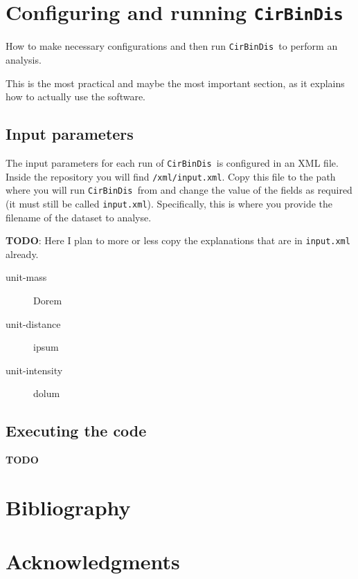 \documentclass[a4paper, 12pt, english, titlepage]{article}
\newcommand{\sname}{\texttt{CirBinDis }}
\begin{document}
\section{Configuring and running \sname}

How to make necessary configurations and then run \sname to perform an analysis.

This is the most practical and maybe the most important section, as it explains how to actually use the software.

\subsection{Input parameters}
    The input parameters for each run of \sname is configured in an XML file. Inside the repository you will find \texttt{/xml/input.xml}. Copy this file to the path where you will run \sname from and change the value of the fields as required (it must still be called \texttt{input.xml}). Specifically, this is where you provide the filename of the dataset to analyse.

    \textbf{TODO}: Here I plan to more or less copy the explanations that are in \texttt{input.xml} already.

    \begin{description}
        \item[unit-mass] Dorem
        \item[unit-distance] ipsum
        \item[unit-intensity] dolum
    \end{description}

\subsection{Executing the code}
    \textbf{TODO}

\section{Bibliography}


\section{Acknowledgments}
\end{document}
